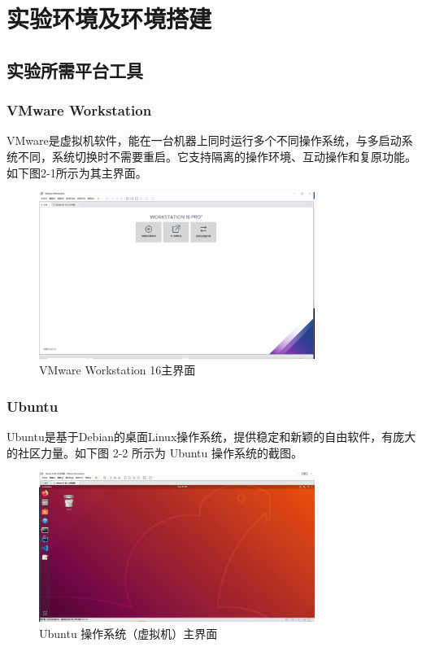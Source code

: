 \chapter{实验环境及环境搭建}

\section{实验所需平台工具}

\subsection{VMware Workstation}

VMware是虚拟机软件，能在一台机器上同时运行多个不同操作系统，与多启动系统不同，系统切换时不需要重启。它支持隔离的操作环境、互动操作和复原功能。如下图2-1所示为其主界面。

\begin{figure}[H]
  \centering
  \includegraphics[width=0.8\textwidth]{figures/chapter2/2-1.jpg}
  \caption{VMware Workstation 16主界面}
  \label{fig:2 VMware Workstation 16主界面}
\end{figure}

\subsection{Ubuntu}

Ubuntu是基于Debian的桌面Linux操作系统，提供稳定和新颖的自由软件，有庞大的社区力量。如下图 2-2 所示为 Ubuntu 操作系统的截图。

\begin{figure}[H]
  \centering
  \includegraphics[width=0.8\textwidth]{figures/chapter2/2-2.jpg}
  \caption{Ubuntu 操作系统（虚拟机）主界面}
  \label{fig:2 Ubuntu 操作系统（虚拟机）主界面}
\end{figure}

